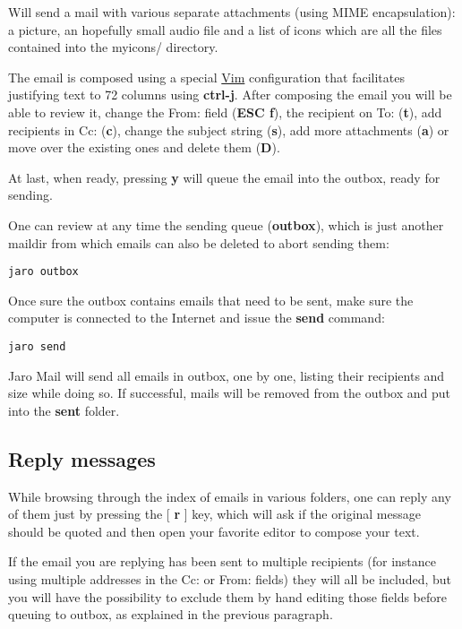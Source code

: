 \documentclass[a4,onecolumn,portrait]{article}
\begin{document}
Will send a mail with various separate attachments (using MIME
encapsulation): a picture, an hopefully small audio file and a list of
icons which are all the files contained into the myicons/ directory.

The email is composed using a special \href{http://www.vim.org/}{Vim} configuration that facilitates justifying text to 72 columns using \textbf{ctrl-j}. After composing the email you will be able to review it, change the From: field (\textbf{ESC f}), the recipient on To: (\textbf{t}), add recipients in Cc: (\textbf{c}), change the subject string (\textbf{s}), add more attachments (\textbf{a}) or move over the existing ones and delete them (\textbf{D}).

At last, when ready, pressing \textbf{y} will queue the email into the outbox, ready for sending.

One can review at any time the sending queue (\textbf{outbox}), which is just another maildir from which emails can also be deleted to abort sending them:

\begin{verbatim}
jaro outbox
\end{verbatim}

Once sure the outbox contains emails that need to be sent, make sure the computer is connected to the Internet and issue the \textbf{send} command:

\begin{verbatim}
jaro send
\end{verbatim}

Jaro Mail will send all emails in outbox, one by one, listing their recipients and size while doing so. If successful, mails will be removed from the outbox and put into the \textbf{sent} folder.
\subsection{Reply messages}
\label{sec-6-3}

While browsing through the index of emails in various folders, one can
reply any of them just by pressing the [ \textbf{r} ] key, which will ask if
the original message should be quoted and then open your favorite
editor to compose your text.

If the email you are replying has been sent to multiple recipients
(for instance using multiple addresses in the Cc: or From: fields)
they will all be included, but you will have the possibility to
exclude them by hand editing those fields before queuing to outbox, as explained in the previous paragraph.
\end{document}
